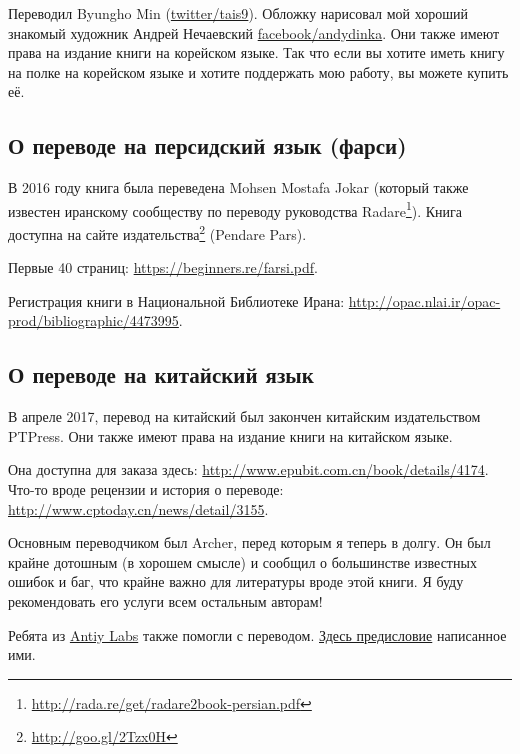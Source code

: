\iffalse
\begin{figure}[H]
\centering
\texttt{[image: acorn\_cover.jpg]}
\end{figure}
\fi

Переводил Byungho Min (\href{http://go.yurichev.com/17344}{twitter/tais9}).
Обложку нарисовал мой хороший знакомый художник Андрей Нечаевский
\href{http://go.yurichev.com/17023}{facebook/andydinka}.
Они также имеют права на издание книги на корейском языке.
Так что если вы хотите иметь  книгу на полке на корейском языке и
хотите поддержать мою работу, вы можете купить её.

\subsection*{О переводе на персидский язык (фарси)}

В 2016 году книга была переведена Mohsen Mostafa Jokar (который также известен иранскому сообществу по переводу руководства Radare\footnote{\url{http://rada.re/get/radare2book-persian.pdf}}).
Книга доступна на сайте издательства\footnote{\url{http://goo.gl/2Tzx0H}} (Pendare Pars).

Первые 40 страниц: \url{https://beginners.re/farsi.pdf}.

Регистрация книги в Национальной Библиотеке Ирана: \url{http://opac.nlai.ir/opac-prod/bibliographic/4473995}.

\subsection*{О переводе на китайский язык}

В апреле 2017, перевод на китайский был закончен китайским издательством PTPress. Они также имеют права на издание книги на китайском языке.

Она доступна для заказа здесь: \url{http://www.epubit.com.cn/book/details/4174}. Что-то вроде рецензии и история о переводе: \url{http://www.cptoday.cn/news/detail/3155}.

Основным переводчиком был Archer, перед которым я теперь в долгу.
Он был крайне дотошным (в хорошем смысле) и сообщил о большинстве известных ошибок и баг, что крайне важно для литературы вроде этой книги.
Я буду рекомендовать его услуги всем остальным авторам!

Ребята из \href{http://www.antiy.net/}{Antiy Labs} также помогли с переводом. \href{http://www.epubit.com.cn/book/onlinechapter/51413}{Здесь предисловие} написанное ими.


